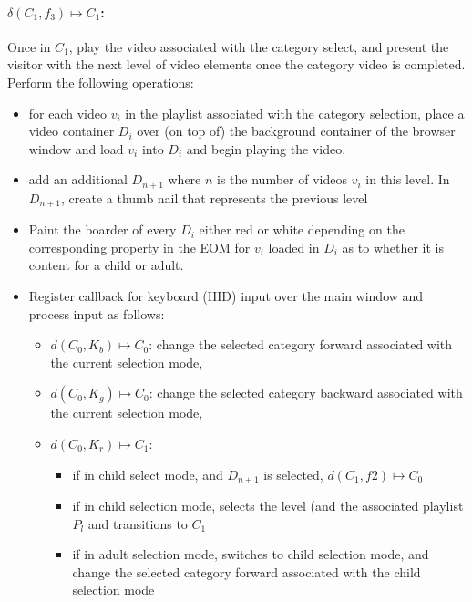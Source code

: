 \documentclass[10pt]{article}
\begin{document}
\paragraph{$\delta(C_{1}, f_{3}) \mapsto C_{1}$:}

Once in $C_{1}$, play the video associated with the category select, and present the visitor with the next level of video elements once the category video is completed. Perform the following operations:

\begin{itemize}
	\item for each video $v_{i}$ in the playlist associated with the category selection, place a video container $D_{i}$ over (on top of) the background container of the browser window and load $v_{i}$ into $D_{i}$ and begin playing the video.
	\item add an additional $D_{n+1}$ where $n$ is the number of videos $v_{i}$ in this level. In $D_{n+1}$, create a thumb nail that represents the previous level
	\item Paint the boarder of every $D_{i}$ either red or white depending on the corresponding property in the EOM for $v_{i}$ loaded in $D_{i}$ as to whether it is content for a child or adult.
	\item Register callback for keyboard (HID) input over the main window and process input as follows:
	\begin{itemize}
		\item $d(C_{0}, K_{b}) \mapsto C_{0}$: change the selected category forward associated with the current selection mode,
		\item $d(C_{0}, K_{g}) \mapsto C_{0}$: change the selected category backward associated with the current selection mode,
		\item $d(C_{0}, K_{r}) \mapsto C_{1}$: 
		\begin{itemize}
			\item if in child select mode, and $D_{n+1}$ is selected, $d(C_{1}, f{2}) \mapsto C_{0}$
			\item if in child selection mode, 	selects the level (and the associated playlist $P_{l}$ and transitions to $C_{1}$
			\item if in adult selection mode, switches to child selection mode, and change the selected category forward associated with the child selection mode
		\end{itemize}
	\end{itemize}
\end{itemize}
\end{document}
